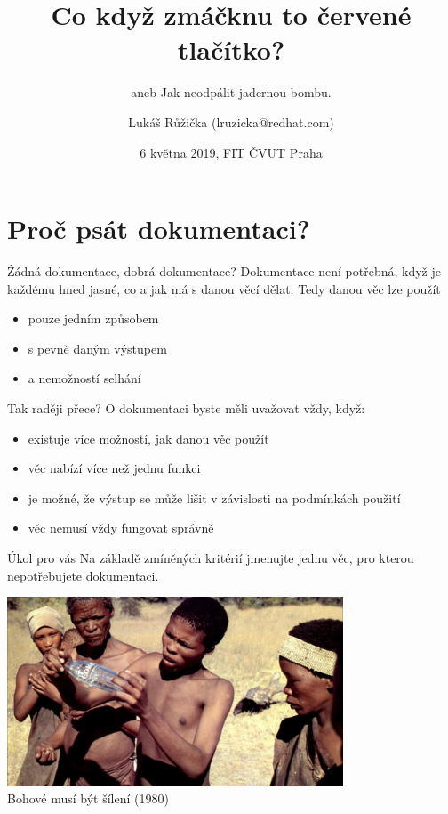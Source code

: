 \documentclass[12pt]{beamer}
\title{Co když zmáčknu to červené tlačítko?}
\subtitle{aneb Jak neodpálit jadernou bombu.}
\author{Lukáš Růžička (lruzicka@redhat.com)}
\date{6 května 2019, FIT ČVUT Praha}
\begin{document}
\begin{frame}[plain]
\maketitle
\end{frame}

    \section{Proč psát dokumentaci?}
    
    	\begin{frame}{Žádná dokumentace, dobrá dokumentace?}
    	  Dokumentace není potřebná, když je každému hned jasné, co a jak má s danou věcí dělat. Tedy danou věc lze použít
    	  
    	  \begin{itemize}
    	  	\item pouze jedním způsobem
    	  	\item s pevně daným výstupem
    	  	\item a nemožností selhání
    	  \end{itemize}
		\end{frame}
	
		\begin{frame}{Tak raději přece?}
		   O dokumentaci byste měli uvažovat vždy, když:
		   \begin{itemize}
		   	\item existuje více možností, jak danou věc použít
		   	\item věc nabízí více než jednu funkci
		   	\item je možné, že výstup se může lišit v závislosti na podmínkách použití
		   	\item věc nemusí vždy fungovat správně
		   \end{itemize}
		\end{frame}
	
		\begin{frame}{Úkol pro vás}
		Na základě zmíněných kritérií jmenujte jednu věc, pro kterou nepotřebujete dokumentaci.
		\end{frame}
	
		\begin{frame}
			\begin{center}
				\includegraphics[width=10cm]{lahev_bohove.jpg}	\\
				Bohové musí být šílení (1980)
			\end{center}
		
		\end{frame}
	
\end{document}
